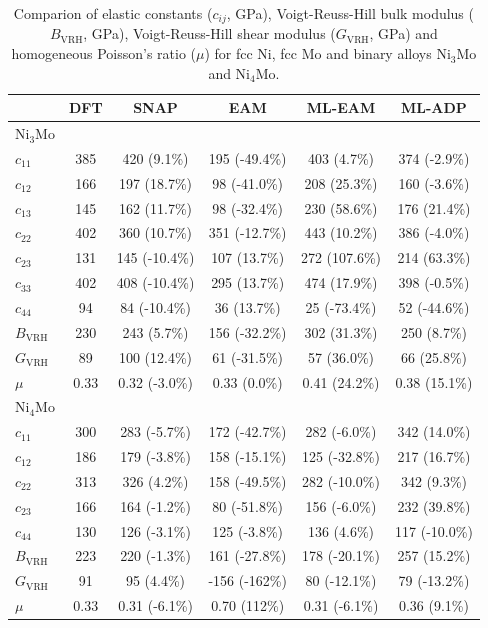 \documentclass[prb,reprint]{revtex4-2}
\begin{document}
\begin{table}[h]
\centering
\begin{tabular}{lccccc}
\hline
                   & DFT  & SNAP          & EAM           & ML-EAM        & ML-ADP        \\
\hline
Ni$_3$Mo \\
$c_{11}$           & 385  & 420 (9.1\%)   & 195 (-49.4\%) & 403 (4.7\%)   & 374 (-2.9\%)  \\
$c_{12}$           & 166  & 197 (18.7\%)  & 98 (-41.0\%)  & 208 (25.3\%)  & 160 (-3.6\%)  \\
$c_{13}$           & 145  & 162 (11.7\%)  & 98 (-32.4\%)  & 230 (58.6\%)  & 176 (21.4\%)  \\
$c_{22}$           & 402  & 360 (10.7\%)  & 351 (-12.7\%) & 443 (10.2\%)  & 386 (-4.0\%)  \\
$c_{23}$           & 131  & 145 (-10.4\%) & 107 (13.7\%)  & 272 (107.6\%) & 214 (63.3\%)  \\
$c_{33}$           & 402  & 408 (-10.4\%) & 295 (13.7\%)  & 474 (17.9\%)  & 398 (-0.5\%)  \\
$c_{44}$           & 94   & 84 (-10.4\%)  & 36 (13.7\%)   & 25 (-73.4\%)  & 52 (-44.6\%)  \\
$B_{\mathrm{VRH}}$ & 230  & 243 (5.7\%)   & 156 (-32.2\%) & 302 (31.3\%)  & 250 (8.7\%)   \\
$G_{\mathrm{VRH}}$ & 89   & 100 (12.4\%)  & 61 (-31.5\%)  & 57 (36.0\%)   & 66 (25.8\%)   \\
$\mu$              & 0.33 & 0.32 (-3.0\%) & 0.33 (0.0\%)  & 0.41 (24.2\%) & 0.38 (15.1\%) \\
\hline
Ni$_4$Mo \\
$c_{11}$           & 300  & 283 (-5.7\%)  & 172 (-42.7\%) & 282 (-6.0\%)  & 342 (14.0\%)  \\
$c_{12}$           & 186  & 179 (-3.8\%)  & 158 (-15.1\%) & 125 (-32.8\%) & 217 (16.7\%)  \\
$c_{22}$           & 313  & 326 (4.2\%)   & 158 (-49.5\%) & 282 (-10.0\%) & 342 (9.3\%)   \\
$c_{23}$           & 166  & 164 (-1.2\%)  & 80 (-51.8\%)  & 156 (-6.0\%)  & 232 (39.8\%)  \\
$c_{44}$           & 130  & 126 (-3.1\%)  & 125 (-3.8\%)  & 136 (4.6\%)   & 117 (-10.0\%) \\
$B_{\mathrm{VRH}}$ & 223  & 220 (-1.3\%)  & 161 (-27.8\%) & 178 (-20.1\%) & 257 (15.2\%)  \\
$G_{\mathrm{VRH}}$ & 91   & 95 (4.4\%)    & -156 (-162\%) & 80 (-12.1\%)  & 79 (-13.2\%)  \\
$\mu$              & 0.33 & 0.31 (-6.1\%) & 0.70 (112\%)  & 0.31 (-6.1\%) & 0.36 (9.1\%)  \\
\hline
\end{tabular}
\caption{\label{table:NiMo_elastic_constants}
Comparion of elastic constants ($c_{ij}$, GPa), Voigt-Reuss-Hill bulk modulus 
($B_{\mathrm{VRH}}$, GPa), Voigt-Reuss-Hill shear modulus ($G_{\mathrm{VRH}}$, 
GPa) and homogeneous Poisson's ratio ($\mu$) for fcc Ni, fcc Mo and binary 
alloys Ni$_{3}$Mo and Ni$_{4}$Mo.
}
\end{table}
\end{document}
